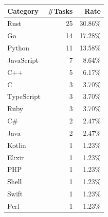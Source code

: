 \begin{tabular}{lrr}
\toprule
Category & \#Tasks & Rate \\
\midrule
Rust & 25 & 30.86\% \\
Go & 14 & 17.28\% \\
Python & 11 & 13.58\% \\
JavaScript & 7 & 8.64\% \\
C++ & 5 & 6.17\% \\
C & 3 & 3.70\% \\
TypeScript & 3 & 3.70\% \\
Ruby & 3 & 3.70\% \\
C\# & 2 & 2.47\% \\
Java & 2 & 2.47\% \\
Kotlin & 1 & 1.23\% \\
Elixir & 1 & 1.23\% \\
PHP & 1 & 1.23\% \\
Shell & 1 & 1.23\% \\
Swift & 1 & 1.23\% \\
Perl & 1 & 1.23\% \\
\bottomrule
\end{tabular}
